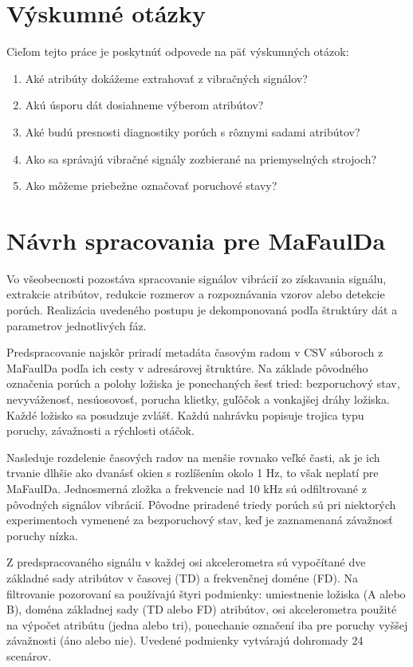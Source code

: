 \section{Výskumné otázky}
Cieľom tejto práce je poskytnúť odpovede na päť výskumných otázok:
\begin{enumerate}
\itemsep0pt
\item Aké atribúty dokážeme extrahovať z vibračných signálov?
\item Akú úsporu dát dosiahneme výberom atribútov?
\item Aké budú presnosti diagnostiky porúch s rôznymi sadami atribútov?
\item Ako sa správajú vibračné signály zozbierané na priemyselných strojoch?
\item Ako môžeme priebežne označovať poruchové stavy?
\end{enumerate}

\section{Návrh spracovania pre MaFaulDa}
Vo všeobecnosti pozostáva spracovanie signálov vibrácií zo získavania signálu, extrakcie atribútov, redukcie rozmerov a rozpoznávania vzorov alebo detekcie porúch. Realizácia uvedeného postupu je dekomponovaná podľa štruktúry dát a parametrov jednotlivých fáz. 

Predspracovanie najskôr priradí metadáta časovým radom v CSV súboroch z MaFaulDa podľa ich cesty v adresárovej štruktúre. Na základe pôvodného označenia porúch a polohy ložiska je ponechaných šesť tried: bezporuchový stav, nevyváženosť, nesúosovosť, porucha klietky, guľôčok a vonkajšej dráhy ložiska. Každé ložisko sa posudzuje zvlášť. Každú nahrávku popisuje trojica typu poruchy, závažnosti a rýchlosti otáčok. 

Nasleduje rozdelenie časových radov na menšie rovnako veľké časti, ak je ich trvanie dlhšie ako dvanásť okien s rozlíšením okolo 1 Hz, to však neplatí pre MaFaulDa. Jednosmerná zložka a frekvencie nad 10 kHz sú odfiltrované z pôvodných signálov vibrácií. Pôvodne priradené triedy porúch sú pri niektorých experimentoch vymenené za bezporuchový stav, keď je zaznamenaná závažnosť poruchy nízka. 

Z predspracovaného signálu v každej osi akcelerometra sú vypočítané dve základné sady atribútov v časovej (TD) a frekvenčnej doméne (FD). Na filtrovanie pozorovaní sa používajú štyri podmienky: umiestnenie ložiska (A alebo B), doména základnej sady (TD alebo FD) atribútov, osi akcelerometra použité na výpočet atribútu (jedna alebo tri), ponechanie označení iba pre poruchy vyššej závažnosti (áno alebo nie). Uvedené podmienky vytvárajú dohromady 24 scenárov. 

